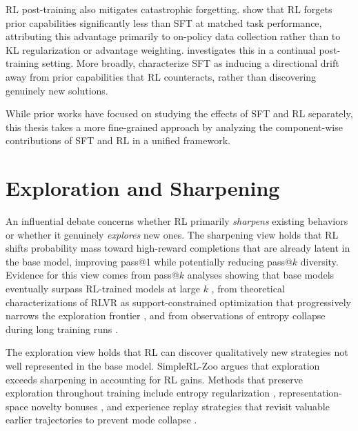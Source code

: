 \documentclass[12pt]{cmuthesis}
\begin{document}
RL post-training also mitigates catastrophic forgetting.
\citet{chenRetainingDoingRole2025} show that RL forgets prior capabilities significantly less than SFT at matched task performance, attributing this advantage primarily to on-policy data collection rather than to KL regularization or advantage weighting.
\citet{laiReinforcementFineTuningNaturally2026} investigates this in a continual post-training setting.
More broadly, \citet{wuGeneralizationSFTReinforcement2025} characterize SFT as inducing a directional drift away from prior capabilities that RL counteracts, rather than discovering genuinely new solutions.

While prior works have focused on studying the effects of SFT and RL separately, this thesis takes a more fine-grained approach by analyzing the component-wise contributions of SFT and RL in a unified framework.


\section{Exploration and Sharpening}

An influential debate concerns whether RL primarily \emph{sharpens} existing behaviors or whether it genuinely \emph{explores} new ones.
The sharpening view holds that RL shifts probability mass toward high-reward completions that are already latent in the base model, improving pass@1 while potentially reducing pass@$k$ diversity. Evidence for this view comes from pass@$k$ analyses showing that base models eventually surpass RL-trained models at large $k$ \citep{yueDoesReinforcementLearning2025}, from theoretical characterizations of RLVR as support-constrained optimization that progressively narrows the exploration frontier \citep{wuInvisibleLeashWhy2026}, and from observations of entropy collapse during long training runs \citep{zhaoEchoChamberRL2025}.

The exploration view holds that RL can discover qualitatively new strategies not well represented in the base model.
SimpleRL-Zoo \citep{zengSimpleRLZooInvestigatingTaming2025} argues that exploration exceeds sharpening in accounting for RL gains.
Methods that preserve exploration throughout training include entropy regularization \citep{cuiEntropyMechanismReinforcement2025}, representation-space novelty bonuses \citep{tuylsRepresentationBasedExplorationLanguage2025}, and experience replay strategies that revisit valuable earlier trajectories to prevent mode collapse \citep{douImprovingRLExploration2025,zhangRLEPReinforcementLearning2025,zhanExGRPOLearningReason2025}.
\end{document}
